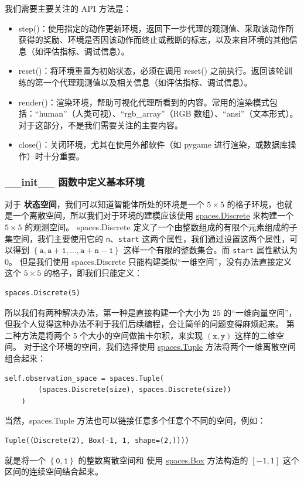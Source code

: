 我们需要主要关注的 API 方法是：
\begin{itemize}
    \item \textsf{step()}：使用指定的动作更新环境，返回下一步代理的观测值、采取该动作所获得的奖励、环境是否因该动作而终止或截断的标志，以及来自环境的其他信息（如评估指标、调试信息）。
    \item \textsf{reset()}：将环境重置为初始状态，必须在调用 \textsf{reset()} 之前执行。返回该轮训练的第一个代理观测值以及相关信息（如评估指标、调试信息）。
    \item \textsf{render()}：渲染环境，帮助可视化代理所看到的内容。常用的渲染模式包括：“human”（人类可视）、“rgb\_array”（RGB 数组）、“ansi”（文本形式）。对于这部分，不是我们需要关注的主要内容。
    \item \textsf{close()}：关闭环境，尤其在使用外部软件（如 pygame 进行渲染，或数据库操作）时十分重要。
\end{itemize}

\subsubsection{\textsf{\_\_init\_\_} 函数中定义基本环境}

对于 \textbf{状态空间}，我们可以知道智能体所处的环境是一个 \(5 \times 5\) 的格子环境，也就是一个离散空间，所以我们对于环境的建模应该使用 \href{https://gymnasium.farama.org/api/spaces/fundamental/#gymnasium.spaces.Discrete}{\textsf{spaces.Discrete}} 来构建一个 \(5 \times 5\) 的观测空间。
\textsf{spaces.Discrete} 定义了一个由整数组成的有限个元素组成的子集空间，我们主要使用它的 \texttt{n}、\texttt{start} 这两个属性，我们通过设置这两个属性，可以得到 \(\left\{ \mathtt{a}, \mathtt{a+1}, \dots, \mathtt{a+n-1} \right\}\) 这样一个有限的整数集合。而 \texttt{start} 属性默认为 \(0\)。
但是我们使用 \textsf{spaces.Discrete} 只能构建类似“一维空间”，没有办法直接定义这个 \(5 \times 5\) 的格子，即我们只能定义：
\begin{verbatim}
spaces.Discrete(5)
\end{verbatim}

所以我们有两种解决办法，第一种是直接构建一个大小为 \(25\) 的“一维向量空间”，但我个人觉得这种办法不利于我们后续编程，会让简单的问题变得麻烦起来。
第二种方法是将两个 \(5\) 个大小的空间做笛卡尔积，来实现 \(\left(\texttt{x}, \texttt{y}\right)\) 这样的二维空间。
对于这个环境的空间，我们选择使用 \href{https://gymnasium.farama.org/api/spaces/composite/#gymnasium.spaces.Tuple}{\textsf{spaces.Tuple}} 方法将两个一维离散空间组合起来：
\begin{verbatim}
self.observation_space = spaces.Tuple(
        (spaces.Discrete(size), spaces.Discrete(size))
    )
\end{verbatim}
当然，{\textsf{spaces.Tuple}} 方法也可以链接任意多个任意个不同的空间，例如：
\begin{verbatim}
Tuple((Discrete(2), Box(-1, 1, shape=(2,))))
\end{verbatim}
就是将一个 \(\left\{ \mathtt{0}, \mathtt{1} \right\}\) 的整数离散空间和 使用 \href{https://gymnasium.farama.org/api/spaces/fundamental/#gymnasium.spaces.Box}{\textsf{spaces.Box}} 方法构造的 \(\left[ -1, 1 \right]\) 这个区间的连续空间结合起来。

